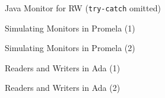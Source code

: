 \begin{wideslide}[bm=,toc=]{\large Java Monitor for RW (\texttt{try-catch} omitted)}
\vspace*{-2ex}
\end{wideslide}

\begin{wideslide}[bm=,toc=]{\large Simulating Monitors in Promela (1)}
\end{wideslide}

\begin{wideslide}[bm=,toc=]{\large Simulating Monitors in Promela (2)}
\end{wideslide}


\begin{wideslide}[bm=,toc=]{\large Readers and Writers in Ada (1)}
\end{wideslide}

\begin{wideslide}[bm=,toc=]{\large Readers and Writers in Ada (2)}
\end{wideslide}
